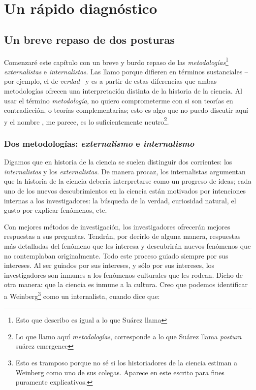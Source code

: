 
\chapter{Un rápido diagnóstico}

\section{Un breve repaso de dos posturas}

\noindent Comenzaré este capítulo con un breve y burdo repaso de las
\emph{metodologías}\footnote{Esto que describo es igual a lo que Suárez
llama } \emph{externalistas} e \emph{internalistas}. Las
llamo  porque difieren en términos sustanciales --por
ejemplo, el de \emph{verdad}-- y es a partir de estas diferencias que
ambas metodologías ofrecen una interpretación distinta de la historia de
la ciencia. Al usar el término \emph{metodología}, no quiero comprometerme
con si son teorías en contradicción, o teorías complementarias; esto es
algo que no puedo discutir aquí y el nombre , me parece,
es lo suficientemente neutro\footnote{ Lo que llamo aquí
\emph{metodologías}, corresponde a lo que Suárez llama \emph{postura}
{suárez emergence} }.



\subsection{Dos metodologías: \emph{externalismo} e \emph{internalismo}}

\noindent Digamos que en historia de la ciencia se suelen distinguir dos
corrientes: los \emph{internalistas} y los \emph{externalistas}. De manera
procaz, los internalistas argumentan que la historia de la ciencia debería
interpretarse como un progreso de ideas; cada uno de los nuevos
descubrimientos en la ciencia están motivados por intenciones internas
a los investigadores: la búsqueda de la verdad, curiosidad natural, el
gusto por explicar fenómenos, etc.

Con mejores métodos de investigación, los investigadores
ofrecerán mejores respuestas a sus preguntas.
Tendrán, por decirlo de alguna manera, respuestas más detalladas del
fenómeno que les interesa y descubrirán nuevos fenómenos que no
contemplaban originalmente. Todo este proceso guiado siempre por sus
intereses. Al ser guiados por sus intereses, y sólo por sus intereses, los
investigadores son inmunes a los fenómenos culturales que les rodean.
Dicho de otra manera: que la ciencia es inmune a la cultura. Creo que
podemos identificar a Weinberg\footnote{Esto es tramposo porque no sé si
los historiadores de la ciencia estiman a Weinberg como uno de sus
colegas. Aparece en este escrito para fines puramente explicativos.}
como un internalista, cuando dice que:

